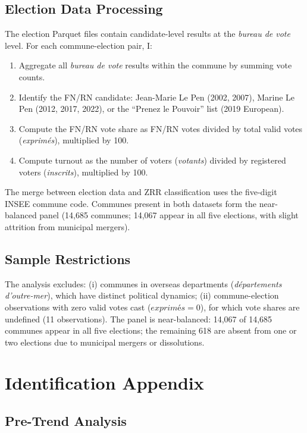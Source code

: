 \documentclass[12pt]{article}
\begin{document}
\subsection{Election Data Processing}

The election Parquet files contain candidate-level results at the \textit{bureau de vote} level. For each commune-election pair, I:

\begin{enumerate}
\item Aggregate all \textit{bureau de vote} results within the commune by summing vote counts.
\item Identify the FN/RN candidate: Jean-Marie Le Pen (2002, 2007), Marine Le Pen (2012, 2017, 2022), or the ``Prenez le Pouvoir'' list (2019 European).
\item Compute the FN/RN vote share as FN/RN votes divided by total valid votes (\textit{exprim\'{e}s}), multiplied by 100.
\item Compute turnout as the number of voters (\textit{votants}) divided by registered voters (\textit{inscrits}), multiplied by 100.
\end{enumerate}

The merge between election data and ZRR classification uses the five-digit INSEE commune code. Communes present in both datasets form the near-balanced panel (14,685 communes; 14,067 appear in all five elections, with slight attrition from municipal mergers).

\subsection{Sample Restrictions}

The analysis excludes: (i) communes in overseas departments (\textit{d\'{e}partements d'outre-mer}), which have distinct political dynamics; (ii) commune-election observations with zero valid votes cast ($\textit{exprim\'{e}s} = 0$), for which vote shares are undefined (11 observations). The panel is near-balanced: 14,067 of 14,685 communes appear in all five elections; the remaining 618 are absent from one or two elections due to municipal mergers or dissolutions.

\section{Identification Appendix} \label{app:identification}

\subsection{Pre-Trend Analysis}
\end{document}
